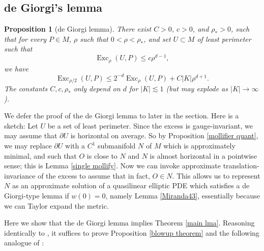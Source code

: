 \documentclass[reqno,10pt]{amsart}
\DeclareMathOperator{\Exc}{Exc}
\newtheorem{lemma}[theorem]{Lemma}
\newtheorem{proposition}[theorem]{Proposition}
\theoremstyle{definition}
\numberwithin{equation}{section}
\begin{document}
\subsection{de Giorgi's lemma}
\begin{proposition}[de Giorgi lemma]\label{de Giorgi}
There exist $C > 0$, $c > 0$, and $\rho_* > 0$, such that for every $P \in M$, $\rho$ such that $0 < \rho < \rho_*$, and set $U \subset M$ of least perimeter such that 
$$\Exc_\rho(U, P) \leq c\rho^{d - 1},$$
we have 
$$\Exc_{\rho/2}(U, P) \leq 2^{-d} \Exc_\rho(U, P) + C|K|\rho^{d + 1}.$$
The constants $C, c, \rho_*$ only depend on $d$ for $|K| \lesssim 1$ (but may explode as $|K| \to \infty$).
\end{proposition}

We defer the proof of the de Giorgi lemma to later in the section. Here is a sketch:
Let $U$ be a set of least perimeter.
Since the excess is gauge-invariant, we may assume that $\partial U$ is horizontal on average.
So by Proposition \ref{mollifier quant}, we may replace $\partial U$ with a $C^1$ submanifold $N$ of $M$ which is approximately minimal, and such that $O$ is close to $N$ and $N$ is almost horizontal in a pointwise sense; this is Lemma \ref{single mollify}.
Now we can invoke approximate translation-invariance of the excess to assume that in fact, $O \in N$.
This allows us to represent $N$ as an approximate solution of a quasilinear elliptic PDE which satisfies a de Giorgi-type lemma if $w(0) = 0$, namely Lemma \ref{Miranda43}, essentially because we can Taylor expand the metric.

Here we show that the de Giorgi lemma implies Theorem \ref{main lma}.
Reasoning identically to \cite[Corollary 9.5]{Giusti77}, it suffices to prove Proposition \ref{blowup theorem} and the following analogue of \cite[Theorem 8.2]{Giusti77}:

\end{document}
